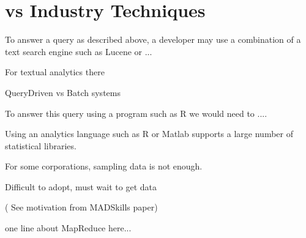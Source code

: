 
\section{{\system } vs Industry Techniques}

To answer a query as described above, a developer may use a combination of 
a text search engine such as Lucene or ...

For textual analytics there 

QueryDriven vs Batch systems

To answer this query using a program such as R we would need to ....

Using an analytics language such as R or Matlab supports a large number of 
statistical libraries.

For some corporations, sampling data is not enough.

Difficult to adopt, must wait to get data 

( See motivation from MADSkills paper)

one line about MapReduce here...
